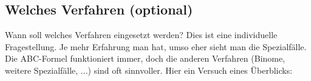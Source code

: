 






\newpage



\TALS{}%
\newpage





\TALS{}

\TALS{}

\newpage


\TALS{}
\newpage
\TALS{}
\newpage

\subsection{Welches Verfahren (optional)}
Wann soll welches Verfahren eingesetzt werden? Dies ist eine
individuelle Fragestellung. Je mehr Erfahrung man hat, umso eher sieht
man die Spezialfälle. Die ABC-Formel funktioniert immer, doch
die anderen Verfahren (Binome, weitere Spezialfälle, ...)
sind oft sinnvoller. Hier ein Versuch eines Überblicks:

